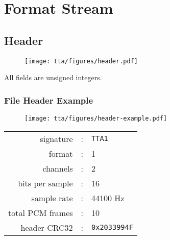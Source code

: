 
\section{Format Stream}


\clearpage

\subsection{Header}
\begin{figure}[h]
  \texttt{[image: tta/figures/header.pdf]}
\end{figure}
\par
\noindent
All fields are unsigned integers.

\subsubsection{File Header Example}
\begin{figure}[h]
  \texttt{[image: tta/figures/header-example.pdf]}
\end{figure}
\begin{table}[h]
  \begin{tabular}{rcl}
    \textsf{signature} & : & \texttt{TTA1} \\
    \textsf{format} & : & 1 \\
    \textsf{channels} & : & 2 \\
    \textsf{bits per sample} & : & 16 \\
    \textsf{sample rate} & : & 44100 Hz \\
    \textsf{total PCM frames} & : & 10 \\
    \textsf{header CRC32} & : & \texttt{0x2033994F} \\
  \end{tabular}
\end{table}

\clearpage

